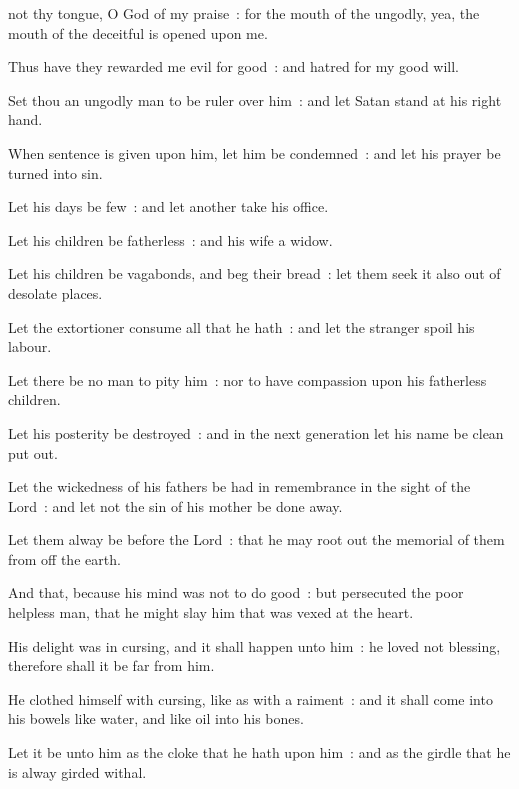  not thy tongue, O God of my praise~: for the mouth of the ungodly, yea, the mouth of the deceitful is opened upon me.\par
{}
Thus have they rewarded me evil for good~: and hatred for my good will.\par
{}Set thou an ungodly man to be ruler over him~: and let Satan stand at his right hand.\par
{}When sentence is given upon him, let him be condemned~: and let his prayer be turned into sin.\par
{}Let his days be few~: and let another take his office.\par
{}Let his children be fatherless~: and his wife a widow.\par
{}Let his children be vagabonds, and beg their bread~: let them seek it also out of desolate places.\par
{}Let the extortioner consume all that he hath~: and let the stranger spoil his labour.\par
{}Let there be no man to pity him~: nor to have compassion upon his fatherless children.\par
{}Let his posterity be destroyed~: and in the next generation let his name be clean put out.\par
{}Let the wickedness of his fathers be had in remembrance in the sight of the Lord~: and let not the sin of his mother be done away.\par
{}Let them alway be before the Lord~: that he may root out the memorial of them from off the earth.\par
{}And that, because his mind was not to do good~: but persecuted the poor helpless man, that he might slay him that was vexed at the heart.\par
{}His delight was in cursing, and it shall happen unto him~: he loved not blessing, therefore shall it be far from him.\par
{}He clothed himself with cursing, like as with a raiment~: and it shall come into his bowels like water, and like oil into his bones.\par
{}Let it be unto him as the cloke that he hath upon him~: and as the girdle that he is alway girded withal.\par
